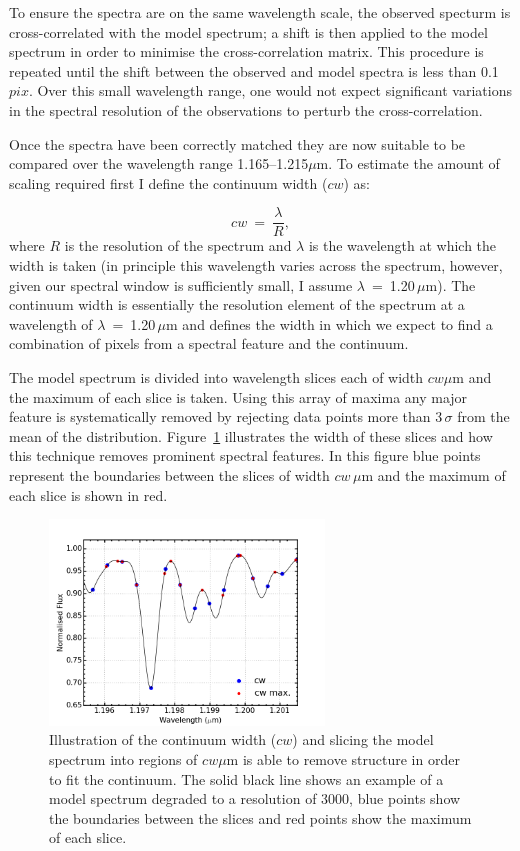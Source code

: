 To ensure the spectra are on the same wavelength scale, the observed specturm is cross-correlated with the model spectrum;
a shift is then applied to the model spectrum in order to minimise the cross-correlation matrix.
This procedure is repeated until the shift between the observed and model spectra is less than 0.1\,$pix$.
Over this small wavelength range, one would not expect significant variations in the spectral resolution of the observations to perturb the cross-correlation.

Once the spectra have been correctly matched they are now suitable to be compared over the wavelength range 1.165--1.215$\mu$m.
To estimate the amount of scaling required first I define the continuum width ($cw$) as:

\begin{equation}
    cw~=~\frac{\lambda}{R}, %
\end{equation}
\noindent where $R$ is the resolution of the spectrum and
$\lambda$ is the wavelength at which the width is taken
(in principle this wavelength varies across the spectrum, however, given our spectral window is sufficiently small, I assume $\lambda$~=~1.20\,$\mu$m).
The continuum width is essentially the resolution element of the spectrum at a wavelength of
$\lambda$~=~1.20\,$\mu$m and defines the width in which we expect to find a combination of pixels from a spectral feature and the continuum.

The model spectrum is divided into wavelength slices each of width $cw\mu$m and the maximum of each slice is taken.
Using this array of maxima any major feature is systematically removed by rejecting data points more than 3\,$\sigma$ from the mean of the distribution.
Figure~\ref{fig:cw} illustrates the width of these slices and how this technique removes prominent spectral features.
In this figure blue points represent the boundaries between the slices of width $cw\,\mu$m and the maximum of each slice is shown in red.


\begin{figure}
 \centering
\includegraphics[width=0.65\textwidth]{JAnal/cw}
\caption[Illustration of continuum width slices and maxima]{
Illustration of the continuum width ($cw$) and slicing the model spectrum into regions of $cw\mu$m is able to remove structure in order to fit the continuum.
The solid black line shows an example of a model spectrum degraded to a resolution of 3000,
blue points show the boundaries between the slices and red points show the maximum of each slice.\label{fig:cw}
         }
\end{figure}


